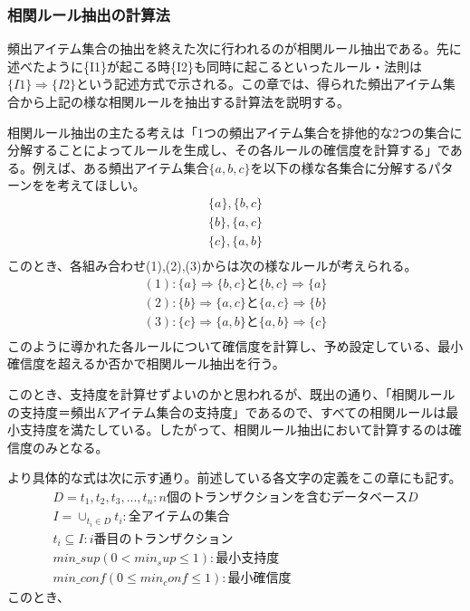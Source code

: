 \documentclass[dvipdfmx]{jsarticle}
\begin{document}
\subsubsection{相関ルール抽出の計算法}
頻出アイテム集合の抽出を終えた次に行われるのが相関ルール抽出である。先に述べたように\{I1\}が起こる時\{I2\}も同時に起こるといったルール・法則は$\{I1\} \Rightarrow \{I2\}$という記述方式で示される。この章では、得られた頻出アイテム集合から上記の様な相関ルールを抽出する計算法を説明する。\par
相関ルール抽出の主たる考えは「1つの頻出アイテム集合を排他的な2つの集合に分解することによってルールを生成し、その各ルールの確信度を計算する」である。例えば、ある頻出アイテム集合$\{a, b, c\}$を以下の様な各集合に分解するパターンをを考えてほしい。
\begin{gather}
  \{a\}, \{b, c\} \\
  \{b\}, \{a, c\} \\
  \{c\}, \{a, b\} \\
\end{gather}
このとき、各組み合わせ(1),(2),(3)からは次の様なルールが考えられる。
\begin{gather*}
  (1):\{a\} \Rightarrow \{b, c\}と\{b, c\} \Rightarrow \{a\}\\
  (2):\{b\} \Rightarrow \{a, c\}と\{a, c\} \Rightarrow \{b\}\\
  (3):\{c\} \Rightarrow \{a, b\}と\{a, b\} \Rightarrow \{c\}\\
\end{gather*}
このように導かれた各ルールについて確信度を計算し、予め設定している、最小確信度を超えるか否かで相関ルール抽出を行う。\par
このとき、支持度を計算せずよいのかと思われるが、既出の通り、「相関ルールの支持度＝頻出$K$アイテム集合の支持度」であるので、すべての相関ルールは最小支持度を満たしている。したがって、相関ルール抽出において計算するのは確信度のみとなる。\par
より具体的な式は次に示す通り。前述している各文字の定義をこの章にも記す。
\begin{gather*}
  D = {t_{1}, t_{2}, t_{3},..., t_{n}}:n個のトランザクションを含むデータベースD\\
  I = \cup_{t_{i}\in D}t_{i}:全アイテムの集合 \\
  t_{i} \subseteq I:i番目のトランザクション \\
  min\_sup(0 < min_sup \le 1):最小支持度 \\
  min\_conf(0 \le min_conf \le 1):最小確信度
\end{gather*}
このとき、
\end{document}
